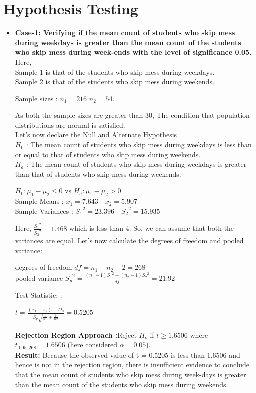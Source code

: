\documentclass{article}
\begin{document}
\section{Hypothesis Testing}
\begin{itemize}
\item{\textbf{Case-1: Verifying if the mean count of students who skip mess during weekdays is greater than the mean count of the students who skip mess during week-ends with the level of significance 0.05.}}\\
Here, \\
Sample 1 is that of the students who skip mess during weekdays.\\
Sample 2 is that of the students who skip mess during weekends.
\begin{center}
Sample sizes : $n_1 = 216$ \quad $n_2 = 54$.
\end{center}
As both the sample sizes are greater than 30, The condition that population distributions are normal is satisfied.\\
Let's now declare the Null and Alternate Hypothesis\\
\textbf{$H_0$} : The mean count of students who skip mess during weekdays is less than or equal to that of students who skip mess during weekends.\\
\textbf{$H_a$} : The mean count of students who skip mess during weekdays is greater than that of students who skip mess during weekends.
\begin{center}
$H_0:\mu_1 - \mu_2 \leq 0$  vs  $H_a:\mu_1 - \mu_2 > 0$\\
Sample Means : $\bar{x_1} = 7.643  \quad \bar{x_2} = 5.907 $\\
Sample Variances : ${S_1}^2 = 23.396 \quad {S_2}^2 = 15.935$\\
\end{center}
Here, $\frac{{S_1}^2}{{S_2}^2} = 1.468$ which is less than 4. So, we can assume that both the variances are equal.
Let's now calculate the degrees of freedom and pooled variance:
\begin{center}
degrees of freedom $df = n_1 + n_2 - 2 = 268$\\
pooled variance ${S_p}^2 = \frac{\left(n_1-1\right){S_1}^2 + \left(n_2-1\right){S_2}^2}{df} = 21.92$
\end{center}
Test Statistic: :
\begin{center}
$t = \frac{\left(\bar{x_1}-\bar{x_2}\right) - D_0}{S_p\sqrt{\frac{1}{n_1}+\frac{1}{n2}}} = 0.5205$\\
\end{center}
\textbf{Rejection Region Approach :}Reject $H_o$ if $t \geq 1.6506$ where $t_{0.05,268} = 1.6506$ (here considered $\alpha = 0.05$).\\
\textbf{Result:} Because the observed value of t = 0.5205 is less than 1.6506 and hence is not in the rejection region, there is insufficient evidence to conclude that the mean count of students who skip mess during week-days is greater than the mean count of the students who skip mess during weekends.\\


\end{itemize}
\end{document}
